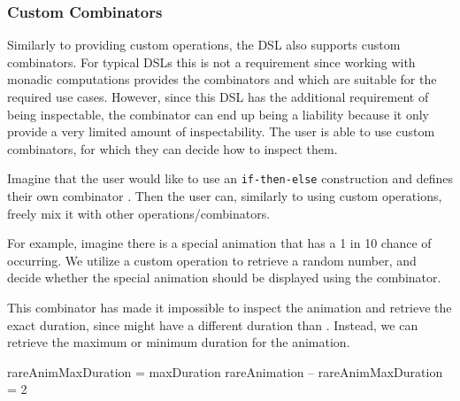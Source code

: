 \subsubsection{Custom Combinators}
\label{sec:customcomb}

Similarly to providing custom operations, the DSL also supports custom combinators. For typical DSLs this is not a requirement since working with monadic computations provides the combinators \hs{>>=} and  which are suitable for the required use cases. However, since this DSL has the additional requirement of being inspectable, the \hs{>>=} combinator can end up being a liability because it only provide a very limited amount of inspectability. The user is able to use custom combinators, for which they can decide how to inspect them.

Imagine that the user would like to use an \texttt{if-then-else} construction and defines their own combinator . Then the user can, similarly to using custom operations, freely mix it with other operations/combinators.

For example, imagine there is a special animation that has a 1 in 10 chance of occurring. We utilize a custom  operation to retrieve a random number, and decide whether the special animation should be displayed using the  combinator.


This combinator has made it impossible to inspect the animation and retrieve the exact duration, since  might have a different duration than . Instead, we can retrieve the maximum or minimum duration for the animation.

\begin{spec}
rareAnimMaxDuration = maxDuration rareAnimation
-- rareAnimMaxDuration = 2
\end{spec}

